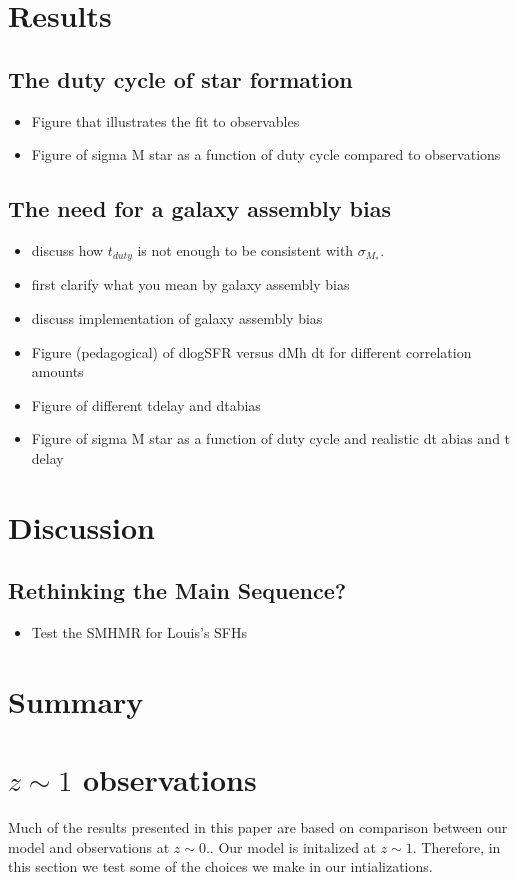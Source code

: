 \documentclass[12pt, letterpaper, preprint]{aastex}
\newcommand{\bitem}{\begin{itemize}}
\newcommand{\eitem}{\end{itemize}}
\begin{document}
\section{Results}
\subsection{The duty cycle of star formation}
\bitem
\item Figure that illustrates the fit to observables 
\item Figure of sigma M star as a function of duty cycle compared to observations 
\eitem 

\subsection{The need for a galaxy assembly bias}
\bitem
\item discuss how $t_{duty}$ is not enough to be consistent with $\sigma_{M_*}$. 
\item first clarify what you mean by galaxy assembly bias 
\item discuss implementation of galaxy assembly bias
\item Figure (pedagogical) of dlogSFR versus dMh dt for different correlation amounts 
\item Figure of different tdelay and dtabias 
\item Figure of sigma M star as a function of duty cycle and realistic dt abias and t delay 
\eitem

\section{Discussion} \label{sec:discussion}
\subsection{Rethinking the Main Sequence?}
\bitem 
\item Test the SMHMR for Louis's SFHs 
\eitem 

\section{Summary} \label{sec:summary}


\appendix
\section{$z \sim 1$ observations} \label{app:z1}
Much of the results presented in this paper are based on comparison 
between our model and observations at $z \sim 0.$. Our model is initalized 
at $z \sim 1$. Therefore, in this section we test some of the choices 
we make in our intializations. 
\end{document}
